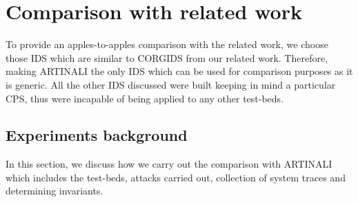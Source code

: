 
\chapter{Comparison with related work}
\label{ch:comparisonwithrelatedwork}

To provide an apples-to-apples comparison with the related work, we choose those \ac{IDS} which are similar to \ac{CORGIDS} from our related work. Therefore, making ARTINALI the only \ac{IDS} which can be used for comparison purposes as it is generic. All the other \ac{IDS} discussed were built keeping in mind a particular \ac{CPS}, thus were incapable of being applied to any other test-beds.

\section{Experiments background}
In this section, we discuss how we carry out the comparison with ARTINALI which includes the test-beds, attacks carried out, collection of system traces and determining invariants. 
